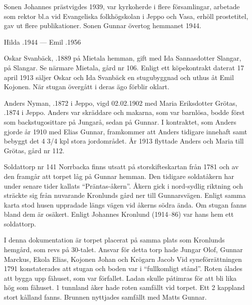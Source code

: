 Sonen Johannes prästvigdes 1939, var kyrkoherde i flere församlingar, arbetade som rektor bl.a vid  Evangeliska folkhögskolan i Jeppo och Vasa, erhöll prostetitel, gav ut flere publikationer. Sonen Gunnar övertog hemmanet 1944.

Hilda .1944  ---  Emil .1956


Oskar Svanbäck, .1889 på Mietala hemman, gift med Ida Sannasdotter Slangar,  på Slangar. Se närmare Mietala, gård nr 106. Enligt ett köpekontrakt daterat 17 april 1913 säljer Oskar och Ida Svanbäck en stugubyggnad och uthus åt Emil Kojonen. När stugan övergått i deras ägo förblir oklart.


Anders Nyman, .1872 i Jeppo, vigd 02.02.1902 med Maria Eriksdotter Grötas, .1874 i Jeppo. Anders var skräddare och makarna, som var barnlösa, bodde först som backstugosittare på Jungarå, sedan på Gunnar. I kontraktet, som Anders gjorde år 1910 med Elias Gunnar, framkommer att Anders tidigare innehaft samt bebyggt det 4 3/4 kpl stora jordområdet. År 1913 flyttade Anders och Maria till Grötas, gård nr 112.


Soldattorp nr 141 Norrbacka finns utsatt på storskifteskartan från 1781 och av den framgår att torpet låg på Gunnar hemman. Den tidigare soldatåkern har under senare tider kallats ``Präntas-åkern''. Åkern gick i nord-sydlig riktning och sträckte sig från nuvarande Kronlunds gård ner till Gunnarsvägen. Enligt samma karta stod husen uppradade längs vägen vid åkerns södra ända. Om stugan fanns bland dem är osäkert. Enligt Johannes Kronlund (1914--86) var hans hem ett soldattorp.

I denna dokumentation är torpet placerat på samma plats som Kronlunds hemgård, som revs på 30-talet. Ansvar för detta torp hade Jungar Olof, Gunnar Marckus, Ekola Elias, Kojonen Johan och Krögarn Jacob Vid syneförrättningen 1791 konstaterades att stugan och boden var i ``fullkomligt stånd''. Roten ålades att bygga upp fähuset, som var förfallet. Ladan skulle påtimras för att bli lika hög som fähuset. 1 tunnland åker hade roten samfällt vid torpet. Ett 2 kappland stort kålland fanns. Brunnen nyttjades samfällt med Matts Gunnar.


